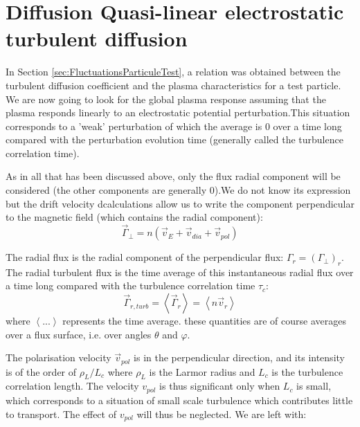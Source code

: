 		\section{Diffusion Quasi-linear electrostatic turbulent diffusion}
		\label{sec:DiffusionQuasiLineaire}
		
		
In Section \ref{sec:FluctuationsParticuleTest}, a relation was obtained between the turbulent diffusion coefficient and the plasma characteristics for a test particle. We are now going to look for the global plasma response assuming that the plasma responds linearly to an electrostatic potential perturbation.This situation corresponds to a 'weak' perturbation of which the average is 0 over a time long compared with the perturbation evolution time (generally called the turbulence correlation time).

As in all that has been discussed above, only the flux radial component will be considered (the other components are generally 0).We do not know its expression but the drift velocity dcalculations allow us to write the component perpendicular to the magnetic field (which contains the radial component):
\[
		\vec{\Gamma}_\perp = n \left( \vec{v}_E + \vec{v}_{dia} + \vec{v}_{pol} \right)
\]

The radial flux is the radial component of the perpendicular flux: $\Gamma_r = (\Gamma_\perp)_r$. The radial turbulent flux is the time average of this instantaneous radial flux over a time long compared with the turbulence correlation time $\tau_c$:
\[
		\vec{\Gamma}_{r,turb} = \left< \vec{\Gamma}_r \right> = \left< n \vec{v}_r \right>
\]
where $\left<...\right>$ represents the time average. these quantities are of course averages over a flux surface, i.e. over angles $\theta$ and $\varphi$.

The polarisation velocity $\vec{v}_{pol}$ is in the perpendicular direction, and its intensity is of the order of $\rho_L / L_c$ where $\rho_L$  is the Larmor radius and $L_c$ is the turbulence correlation length. The velocity $v_{pol}$ is thus significant only when $L_c$ is small, which corresponds to a situation of small scale turbulence which contributes little to transport. The effect of $v_{pol}$ will thus be neglected. We are left with:

